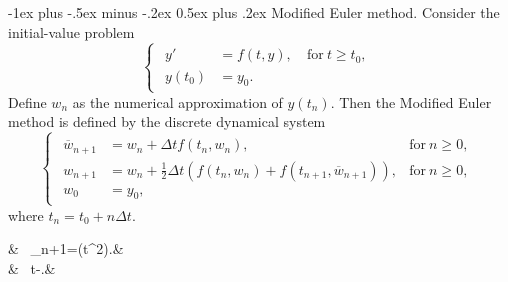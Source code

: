 \documentclass[10pt,landscape,a4paper]{article}
\makeatletter
\renewcommand{\section}{\@startsection{section}{1}{0mm}%
	{-1ex plus -.5ex minus -.2ex}%
	{0.5ex plus .2ex}%
	{\normalfont\large\bfseries}}
\makeatother
\begin{document}
\begin{multicols}{3}
		\section{Modified Euler method.}
		Consider the initial-value problem
		\[
			\begin{cases}
				\begin{aligned}
					y'&=f(t,y), &\ \text{for} \ t\geq t_0, \\ y(t_0)&=y_0.&
				\end{aligned}
			\end{cases}
		\]
		Define $ w_n $ as the numerical approximation of $ y(t_n) $. Then the Modified Euler method is defined by the discrete dynamical system
		\[
			\begin{cases}
				\begin{aligned}
					\overline{w}_{n+1} &= w_n + \Delta tf(t_n,w_n), &\text{for} \ n\geq0,\\
					w_{n+1} &= w_n + \frac{1}{2}\Delta t(f(t_n,w_n)+f(t_{n+1},\overline{w}_{n+1})), &\text{for} \ n\geq 0,\\
					w_0 &= y_0,&
				\end{aligned}
			\end{cases}
		\]
		where $ t_n=t_0+n\Delta t $.
			\begin{flalign*}
				& \ \tau_{n+1}=(\Delta t^2).&\\
				& \ \Delta t\leq-.&
			\end{flalign*}
		

\end{multicols}
\end{document}
